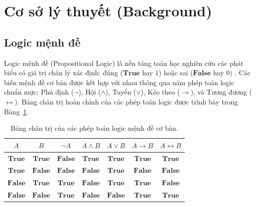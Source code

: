 \documentclass[a4paper,fleqn]{cas-sc}
\begin{document}
\section{Cơ sở lý thuyết (Background)}
\label{sec:background}

\subsection{Logic mệnh đề}
\label{subsec:prop_logic}
Logic mệnh đề (Propositional Logic) là nền tảng toán học nghiên cứu các phát biểu có giá trị chân lý xác định: đúng ($\mathbf{True}$ hay $1$) hoặc sai ($\mathbf{False}$ hay $0$) \cite{simon2020reasoning}. Các biến mệnh đề cơ bản được kết hợp với nhau thông qua năm phép toán logic chuẩn mực: Phủ định ($\neg$), Hội ($\land$), Tuyển ($\lor$), Kéo theo ($\to$), và Tương đương ($\leftrightarrow$). Bảng chân trị hoàn chỉnh của các phép toán logic được trình bày trong Bảng~\ref{tab:truth_table}.

\begin{table}[pos=htbp]
\centering
\caption{Bảng chân trị của các phép toán logic mệnh đề cơ bản.}
\label{tab:truth_table}
\begin{tabular}{ccccccc}
\toprule
$A$ & $B$ & $\neg A$ & $A \land B$ & $A \lor B$ & $A \to B$ & $A \leftrightarrow B$ \\
\midrule
$\mathbf{True}$  & $\mathbf{True}$  & $\mathbf{False}$ & $\mathbf{True}$  & $\mathbf{True}$  & $\mathbf{True}$  & $\mathbf{True}$  \\
$\mathbf{True}$  & $\mathbf{False}$ & $\mathbf{False}$ & $\mathbf{False}$ & $\mathbf{True}$  & $\mathbf{False}$ & $\mathbf{False}$ \\
$\mathbf{False}$ & $\mathbf{True}$  & $\mathbf{True}$  & $\mathbf{False}$ & $\mathbf{True}$  & $\mathbf{True}$  & $\mathbf{False}$ \\
$\mathbf{False}$ & $\mathbf{False}$ & $\mathbf{True}$  & $\mathbf{False}$ & $\mathbf{False}$ & $\mathbf{True}$  & $\mathbf{True}$  \\
\bottomrule
\end{tabular}
\end{table}
\end{document}
